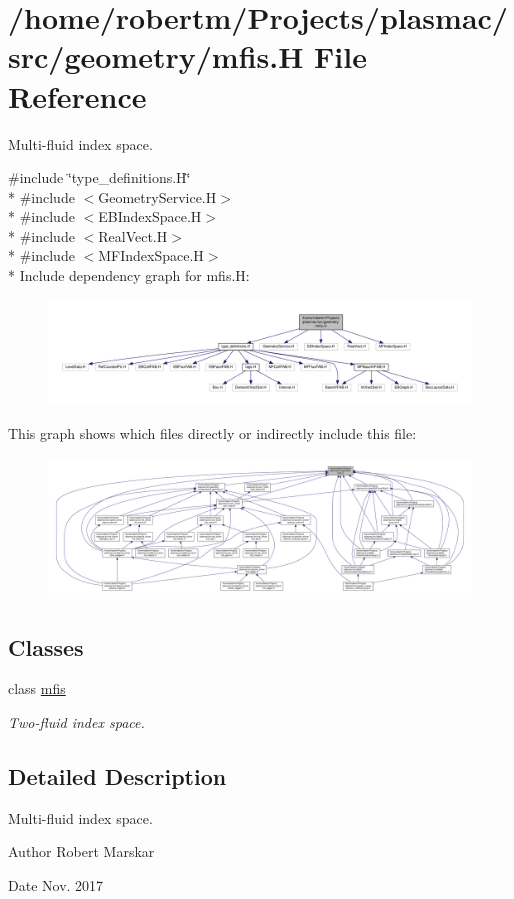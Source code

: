 \hypertarget{mfis_8H}{}\section{/home/robertm/\+Projects/plasmac/src/geometry/mfis.H File Reference}
\label{mfis_8H}


Multi-\/fluid index space.  


{\ttfamily \#include \char`\"{}type\+\_\+definitions.\+H\char`\"{}}\\*
{\ttfamily \#include $<$Geometry\+Service.\+H$>$}\\*
{\ttfamily \#include $<$E\+B\+Index\+Space.\+H$>$}\\*
{\ttfamily \#include $<$Real\+Vect.\+H$>$}\\*
{\ttfamily \#include $<$M\+F\+Index\+Space.\+H$>$}\\*
Include dependency graph for mfis.\+H\+:\nopagebreak
\begin{figure}[H]
\begin{center}
\leavevmode
\includegraphics[width=350pt]{mfis_8H__incl}
\end{center}
\end{figure}
This graph shows which files directly or indirectly include this file\+:\nopagebreak
\begin{figure}[H]
\begin{center}
\leavevmode
\includegraphics[width=350pt]{mfis_8H__dep__incl}
\end{center}
\end{figure}
\subsection*{Classes}
\begin{DoxyCompactItemize}
\item 
class \hyperlink{classmfis}{mfis}
\begin{DoxyCompactList}\small\item\em Two-\/fluid index space. \end{DoxyCompactList}\end{DoxyCompactItemize}


\subsection{Detailed Description}
Multi-\/fluid index space. 

\begin{DoxyAuthor}{Author}
Robert Marskar 
\end{DoxyAuthor}
\begin{DoxyDate}{Date}
Nov. 2017 
\end{DoxyDate}
